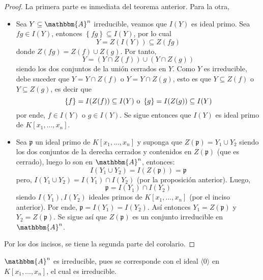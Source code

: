 \documentclass[12pt]{report}
\newcounter{it}
\theoremstyle{largebreak}
\newcommand{\bbm}[1]{\ensuremath{\mathbbm{#1}}}
\newcommand{\fk}[1]{\ensuremath{\mathfrak{#1}}}
\newcommand{\gen}[1]{\ensuremath{\langle#1\rangle}}
\begin{document}
    \begin{proof}
        La primera parte es inmediata del teorema anterior. Para la otra,
        \begin{itemize}
            \item Sea $Y\subseteq\bbm{A}^n$ irreducible, veamos que $I(Y)$ es ideal primo. Sea $fg\in I(Y)$, entonces $\left\{fg \right\}\subseteq I(Y)$, por lo cual
            \begin{equation*}
                Y=Z(I(Y))\subseteq Z(fg)
            \end{equation*}
            donde $Z(fg)=Z(f)\cup Z(g)$. Por tanto,
            \begin{equation*}
                Y=(Y\cap Z(f))\cup (Y\cap Z(g))
            \end{equation*}
            siendo los dos conjuntos de la unión cerrados en $Y$. Como $Y$ es irreducible, debe suceder que $Y=Y\cap Z(f)$ o $Y=Y\cap Z(g)$, esto es que $Y\subseteq Z(f)$ o $Y\subseteq Z(g)$, es decir que
            \begin{equation*}
                \left\{f \right\}=I(Z(f))\subseteq I(Y)\textup{ o }\left\{g \right\}=I(Z(g))\subseteq I(Y)
            \end{equation*}
            por ende, $f\in I(Y)$ o $g\in I(Y)$. Se sigue entonces que $I(Y)$ es ideal primo de $K[x_1,...,x_n]$.
            \item Sea $\fk{p}$ un ideal primo de $K[x_1,...,x_n]$ y suponga que $Z(\fk{p})=Y_1\cup Y_2$ siendo los dos conjuntos de la derecha cerrados y contenidos en $Z(\fk{p})$ (que es cerrado), luego lo son en $\bbm{A}^n$, entonces:
            \begin{equation*}
                I(Y_1\cup Y_2)=I(Z(\fk{p}))=\fk{p}
            \end{equation*}
            pero, $I(Y_1\cup Y_2)=I(Y_1)\cap I(Y_2)$ (por la proposición anterior). Luego,
            \begin{equation*}
                \fk{p}=I(Y_1)\cap I(Y_2)
            \end{equation*}
            siendo $I(Y_1),I(Y_2)$ ideales primos de $K[x_1,...,x_n]$ (por el inciso anterior). Por ende, $\fk{p}=I(Y_1)=I(Y_2)$. Así entonces $Y_1=Z(\fk{p})$ y $Y_2=Z(\fk{p})$. Se sigue así que $Z(\fk{p})$ es un conjunto irreducible en $\bbm{A}^n$.
        \end{itemize}
        Por los dos incisos, se tiene la segunda parte del corolario.
    \end{proof}

    \begin{exa}
        $\bbm{A}^n$ es irreducible, pues se corresponde con el ideal $\gen{0}$ en $K[x_1,...,x_n]$, el cual es irreducible.
    \end{exa}
\end{document}
